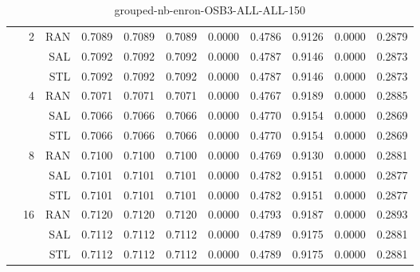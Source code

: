 \begin{center}
\begin{table}[htbp]
\begin{center}
\begin{tabular}{ | r | r | r | r | r | r | r | r | r | r | r |}
 & \multirow{3}{*}{2} & RAN & 0.7089 & 0.7089 & 0.7089 & 0.0000 & 0.4786 & 0.9126 & 0.0000 & 0.2879\\ \cline{3-11}
 &   & SAL & 0.7092 & 0.7092 & 0.7092 & 0.0000 & 0.4787 & 0.9146 & 0.0000 & 0.2873\\ \cline{3-11}
 &   & STL & 0.7092 & 0.7092 & 0.7092 & 0.0000 & 0.4787 & 0.9146 & 0.0000 & 0.2873\\ \cline{2-11}
 & \multirow{3}{*}{4} & RAN & 0.7071 & 0.7071 & 0.7071 & 0.0000 & 0.4767 & 0.9189 & 0.0000 & 0.2885\\ \cline{3-11}
 &   & SAL & 0.7066 & 0.7066 & 0.7066 & 0.0000 & 0.4770 & 0.9154 & 0.0000 & 0.2869\\ \cline{3-11}
 &   & STL & 0.7066 & 0.7066 & 0.7066 & 0.0000 & 0.4770 & 0.9154 & 0.0000 & 0.2869\\ \cline{2-11}
 & \multirow{3}{*}{8} & RAN & 0.7100 & 0.7100 & 0.7100 & 0.0000 & 0.4769 & 0.9130 & 0.0000 & 0.2881\\ \cline{3-11}
 &   & SAL & 0.7101 & 0.7101 & 0.7101 & 0.0000 & 0.4782 & 0.9151 & 0.0000 & 0.2877\\ \cline{3-11}
 &   & STL & 0.7101 & 0.7101 & 0.7101 & 0.0000 & 0.4782 & 0.9151 & 0.0000 & 0.2877\\ \cline{2-11}
 & \multirow{3}{*}{16} & RAN & 0.7120 & 0.7120 & 0.7120 & 0.0000 & 0.4793 & 0.9187 & 0.0000 & 0.2893\\ \cline{3-11}
 &   & SAL & 0.7112 & 0.7112 & 0.7112 & 0.0000 & 0.4789 & 0.9175 & 0.0000 & 0.2881\\ \cline{3-11}
 &   & STL & 0.7112 & 0.7112 & 0.7112 & 0.0000 & 0.4789 & 0.9175 & 0.0000 & 0.2881\\ \cline{2-11}
\hline
\end{tabular}
\caption{grouped-nb-enron-OSB3-ALL-ALL-150}
\end{center}
 \end{table}
\end{center}

